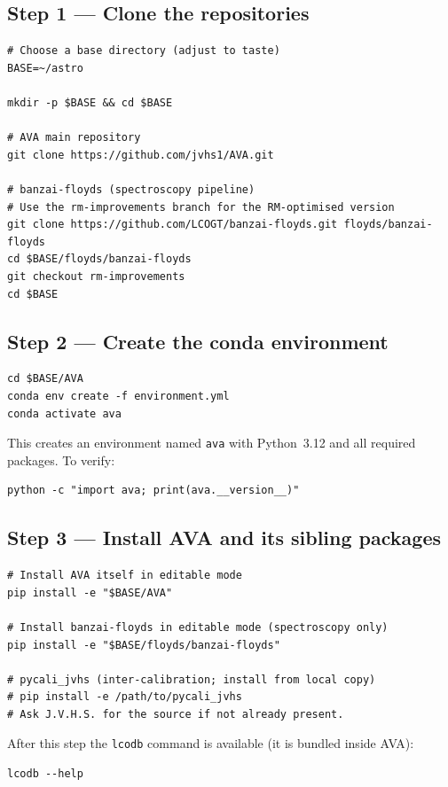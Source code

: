 \documentclass[12pt,a4paper]{article}
\begin{document}
\subsection{Step 1 --- Clone the repositories}

\begin{lstlisting}[style=shell]
# Choose a base directory (adjust to taste)
BASE=~/astro

mkdir -p $BASE && cd $BASE

# AVA main repository
git clone https://github.com/jvhs1/AVA.git

# banzai-floyds (spectroscopy pipeline)
# Use the rm-improvements branch for the RM-optimised version
git clone https://github.com/LCOGT/banzai-floyds.git floyds/banzai-floyds
cd $BASE/floyds/banzai-floyds
git checkout rm-improvements
cd $BASE
\end{lstlisting}

\subsection{Step 2 --- Create the conda environment}

\begin{lstlisting}[style=shell]
cd $BASE/AVA
conda env create -f environment.yml
conda activate ava
\end{lstlisting}

This creates an environment named \texttt{ava} with Python~3.12 and all
required packages.  To verify:
\begin{lstlisting}[style=shell]
python -c "import ava; print(ava.__version__)"
\end{lstlisting}

\subsection{Step 3 --- Install AVA and its sibling packages}

\begin{lstlisting}[style=shell]
# Install AVA itself in editable mode
pip install -e "$BASE/AVA"

# Install banzai-floyds in editable mode (spectroscopy only)
pip install -e "$BASE/floyds/banzai-floyds"

# pycali_jvhs (inter-calibration; install from local copy)
# pip install -e /path/to/pycali_jvhs
# Ask J.V.H.S. for the source if not already present.
\end{lstlisting}

After this step the \texttt{lcodb} command is available (it is bundled inside
AVA):
\begin{lstlisting}[style=shell]
lcodb --help
\end{lstlisting}
\end{document}
